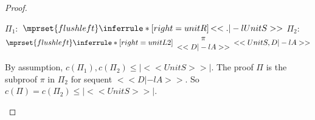 \begin{proof}
\begin{enumerate}
\begin{itemize}
\begin{center}
        \scriptsize
        $\Pi_1:$
        \begin{math}
          $$\mprset{flushleft}
          \inferrule* [right={\tiny unitR}] {
            \,
          }{<<. |-l UnitS>>}
        \end{math}
        \qquad\qquad
        $\Pi_2:$
        \begin{math}
          $$\mprset{flushleft}
          \inferrule* [right={\tiny unitL2}] {
            {
              \begin{array}{c}
                \pi \\
                {<<D |-l A>>}
              \end{array}
            }
          }{<<UnitS, D |-l A>>}
        \end{math}
      \end{center}
      By assumption, $c(\Pi_1),c(\Pi_2)\leq |<<UnitS>>|$. The proof $\Pi$ is the subproof $\pi$
      in $\Pi_2$ for sequent $<<D |-l A>>$. So $c(\Pi)=c(\Pi_2)\leq |<<UnitS>>|$.


\end{itemize}
\end{enumerate}
\end{proof}
